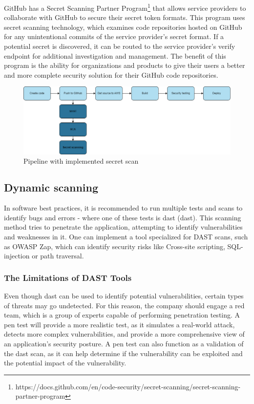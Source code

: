 GitHub has a Secret Scanning Partner Program\footnote{https://docs.github.com/en/code-security/secret-scanning/secret-scanning-partner-program} that allows service providers to collaborate with GitHub to secure their secret token formats. This program uses secret scanning technology, which examines code repositories hosted on GitHub for any unintentional commits of the service provider's secret format. If a potential secret is discovered, it can be routed to the service provider's verify endpoint for additional investigation and management. The benefit of this program is the ability for organizations and products to give their users a better and more complete security solution for their GitHub code repositories. \cite{partnerprogram}


\vspace{2mm}
\begin{figure}[H]
    \centering
    \includegraphics[width=0.8\columnwidth]{Images/pipeline4.png}
    \caption{Pipeline with implemented secret scan}
    \label{fig: Pipeline with implemented secret scan}
\end{figure}

\subsection{Dynamic scanning}
In software best practices, it is recommended to run multiple tests and scans to identify bugs and errors - where one of these tests is \acrlong{dast} (\acrshort{dast}).\cite{bestpracticeSupplyChain} This scanning method tries to penetrate the application, attempting to identify vulnerabilities and weaknesses in it. One can implement a tool specialized for DAST scans, such as OWASP Zap, which can identify security risks like \gls{Cross-site scripting}, \gls{SQL-injection} or path traversal.\cite{dynamictesting}


\subsubsection{The Limitations of DAST Tools}
Even though \acrshort{dast} can be used to identify potential vulnerabilities, certain types of threats may go undetected. For this reason, the company should engage a red team, which is a group of experts capable of performing penetration testing. A pen test will provide a more realistic test, as it simulates a real-world attack, detects more complex vulnerabilities, and provide a more comprehensive view of an application's security posture. A pen test can also function as a validation of the \acrshort{dast} scan, as it can help determine if the vulnerability can be exploited and the potential impact of the vulnerability. \cite{dastpentesting}


